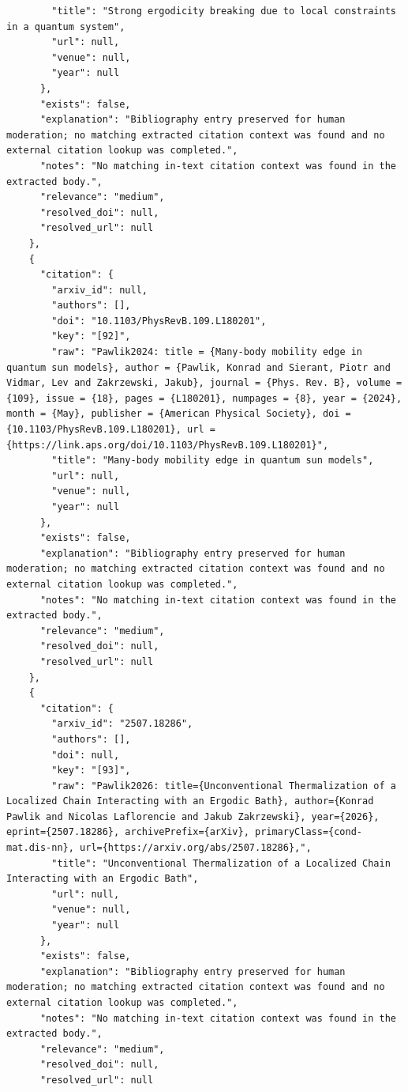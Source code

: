 \documentclass[11pt]{article}
\begin{document}
\begin{verbatim}
        "title": "Strong ergodicity breaking due to local constraints in a quantum system",
        "url": null,
        "venue": null,
        "year": null
      },
      "exists": false,
      "explanation": "Bibliography entry preserved for human moderation; no matching extracted citation context was found and no external citation lookup was completed.",
      "notes": "No matching in-text citation context was found in the extracted body.",
      "relevance": "medium",
      "resolved_doi": null,
      "resolved_url": null
    },
    {
      "citation": {
        "arxiv_id": null,
        "authors": [],
        "doi": "10.1103/PhysRevB.109.L180201",
        "key": "[92]",
        "raw": "Pawlik2024: title = {Many-body mobility edge in quantum sun models}, author = {Pawlik, Konrad and Sierant, Piotr and Vidmar, Lev and Zakrzewski, Jakub}, journal = {Phys. Rev. B}, volume = {109}, issue = {18}, pages = {L180201}, numpages = {8}, year = {2024}, month = {May}, publisher = {American Physical Society}, doi = {10.1103/PhysRevB.109.L180201}, url = {https://link.aps.org/doi/10.1103/PhysRevB.109.L180201}",
        "title": "Many-body mobility edge in quantum sun models",
        "url": null,
        "venue": null,
        "year": null
      },
      "exists": false,
      "explanation": "Bibliography entry preserved for human moderation; no matching extracted citation context was found and no external citation lookup was completed.",
      "notes": "No matching in-text citation context was found in the extracted body.",
      "relevance": "medium",
      "resolved_doi": null,
      "resolved_url": null
    },
    {
      "citation": {
        "arxiv_id": "2507.18286",
        "authors": [],
        "doi": null,
        "key": "[93]",
        "raw": "Pawlik2026: title={Unconventional Thermalization of a Localized Chain Interacting with an Ergodic Bath}, author={Konrad Pawlik and Nicolas Laflorencie and Jakub Zakrzewski}, year={2026}, eprint={2507.18286}, archivePrefix={arXiv}, primaryClass={cond-mat.dis-nn}, url={https://arxiv.org/abs/2507.18286},",
        "title": "Unconventional Thermalization of a Localized Chain Interacting with an Ergodic Bath",
        "url": null,
        "venue": null,
        "year": null
      },
      "exists": false,
      "explanation": "Bibliography entry preserved for human moderation; no matching extracted citation context was found and no external citation lookup was completed.",
      "notes": "No matching in-text citation context was found in the extracted body.",
      "relevance": "medium",
      "resolved_doi": null,
      "resolved_url": null

\end{verbatim}
\end{document}
